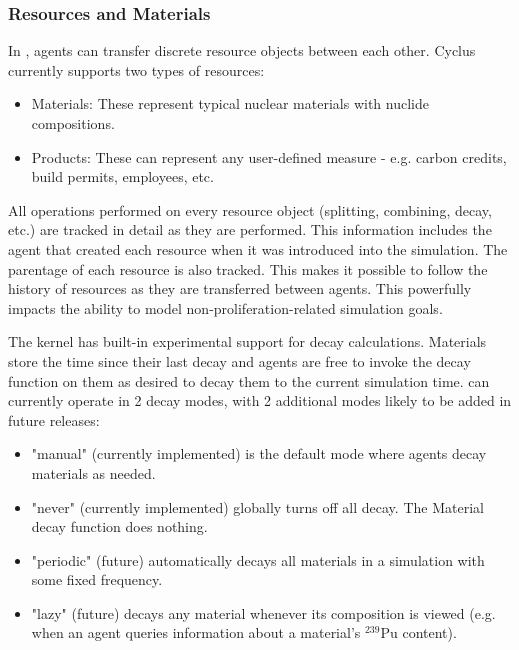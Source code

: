 
\subsubsection{Resources and Materials}


In \Cyclus, agents can transfer discrete resource objects between each other.
Cyclus currently supports two types of resources:

\begin{itemize}

  \item Materials: These represent typical nuclear materials with
      nuclide compositions.

  \item Products: These can represent any user-defined measure - e.g. carbon
      credits, build permits, employees, etc.

\end{itemize}

All operations performed on every resource object (splitting, combining,
decay, etc.) are tracked in detail as they are performed.  This information
includes the agent that created each resource when it was introduced into the
simulation.  The parentage of each resource is also tracked. This makes it
possible to follow the history of resources as they are transferred between
agents.  This powerfully impacts the ability to model
non-proliferation-related simulation goals. 

The \Cyclus kernel has built-in experimental support for decay calculations.
Materials store the time since their last decay and agents are free to
invoke the decay function on them as desired to decay them to the current
simulation time. \Cyclus can currently operate in 2 decay modes, with 2 additional
modes likely to be added in future releases:

\begin{itemize}

    \item "manual" (currently implemented) is the default mode 
        where agents decay materials as needed.

    \item "never" (currently implemented) globally turns off all decay.
        The Material decay function does nothing.

    \item "periodic" (future) automatically decays all materials in a
        simulation with some fixed frequency.

    \item "lazy" (future) decays any material whenever its composition is
        viewed (e.g. when an agent queries information about a material's
        $^{239}$Pu content).

\end{itemize}

